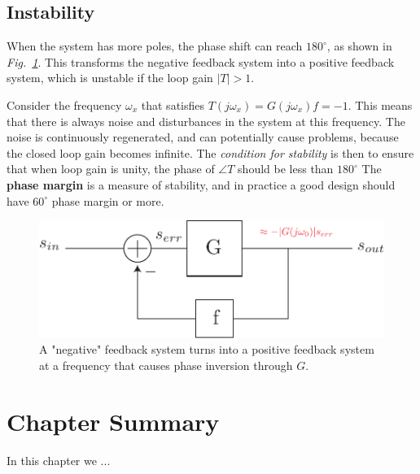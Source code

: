 \subsection{Instability}
When the system has more poles, the phase shift can reach $180^\circ$, as shown in \emph{Fig.~\ref{fig:fbblock_phase}}. 
This transforms the negative feedback system into a positive feedback system, which is unstable if the loop gain $|T|>1$.  

Consider the frequency $\omega_x$ that satisfies $ T(j\omega_x) = G(j{\omega _x})f = -1$. This means that there is always noise and disturbances in the system at this frequency.  The noise is continuously regenerated, and can potentially cause problems, because the closed loop gain becomes infinite. The \textit{condition for stability} is then to ensure that when loop gain is unity, the phase of $\angle T$ should be less than $180^\circ$  The \textbf{phase margin} is a measure of stability, and in practice a good design should have $60^\circ$ phase margin or more.
\begin{figure}[H]
\centering
\includegraphics[scale=.75]{fbblock_phase}
\caption{A "negative" feedback system turns into a positive feedback system at a frequency that causes phase inversion through $G$.}
\label{fig:fbblock_phase}
\end{figure}
%
%
\newpage
\section{Chapter Summary}
In this chapter we ...
